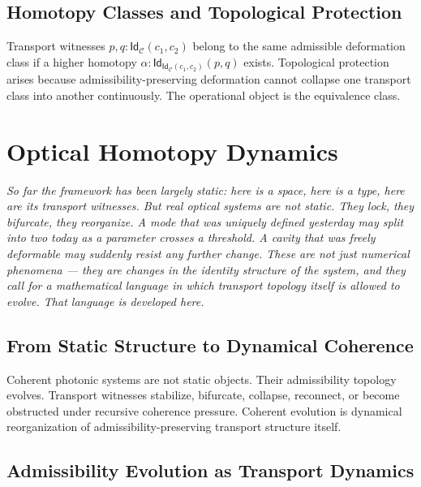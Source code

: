 \documentclass[11pt,openany]{book}
\theoremstyle{definition}
\theoremstyle{plain}
\newcommand{\idtype}{\mathsf{Id}}
\begin{document}
\section{Homotopy Classes and Topological Protection}

Transport witnesses $p, q : \idtype_{\mathcal{C}}(c_1,c_2)$ belong to the same admissible deformation class if a higher homotopy $\alpha : \idtype_{\idtype_{\mathcal{C}}(c_1,c_2)}(p,q)$ exists. Topological protection arises because admissibility-preserving deformation cannot collapse one transport class into another continuously. The operational object is the equivalence class.


\chapter{Optical Homotopy Dynamics}

\noindent\textit{So far the framework has been largely static: here is a space, here is a type, here are its transport witnesses. But real optical systems are not static. They lock, they bifurcate, they reorganize. A mode that was uniquely defined yesterday may split into two today as a parameter crosses a threshold. A cavity that was freely deformable may suddenly resist any further change. These are not just numerical phenomena --- they are changes in the identity structure of the system, and they call for a mathematical language in which transport topology itself is allowed to evolve. That language is developed here.}

\bigskip

\section{From Static Structure to Dynamical Coherence}

Coherent photonic systems are not static objects. Their admissibility topology evolves. Transport witnesses stabilize, bifurcate, collapse, reconnect, or become obstructed under recursive coherence pressure. Coherent evolution is dynamical reorganization of admissibility-preserving transport structure itself.

\section{Admissibility Evolution as Transport Dynamics}
\end{document}
